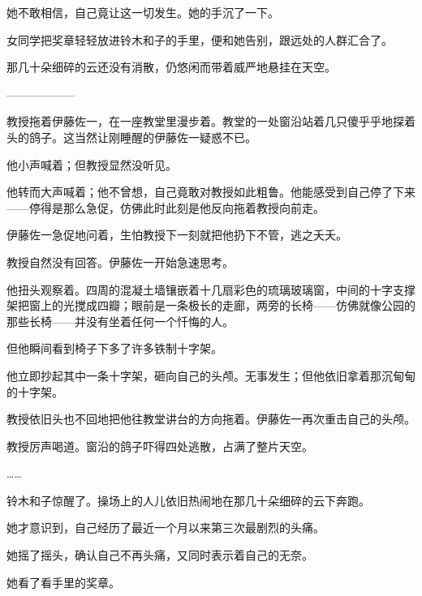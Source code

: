 她不敢相信，自己竟让这一切发生。她的手沉了一下。

女同学把奖章轻轻放进铃木和子的手里，便和她告别，跟远处的人群汇合了。

那几十朵细碎的云还没有消散，仍悠闲而带着威严地悬挂在天空。

\begin{center}
——————
\end{center}

教授拖着伊藤佐一，在一座教堂里漫步着。教堂的一处窗沿站着几只傻乎乎地探着头的鸽子。这当然让刚睡醒的伊藤佐一疑惑不已。

他小声喊着；但教授显然没听见。

他转而大声喊着；他不曾想，自己竟敢对教授如此粗鲁。他能感受到自己停了下来——停得是那么急促，仿佛此时此刻是他反向拖着教授向前走。

伊藤佐一急促地问着，生怕教授下一刻就把他扔下不管，逃之夭夭。

教授自然没有回答。伊藤佐一开始急速思考。


他扭头观察着。四周的混凝土墙镶嵌着十几扇彩色的琉璃玻璃窗，中间的十字支撑架把窗上的光搅成四瓣；眼前是一条极长的走廊，两旁的长椅——仿佛就像公园的那些长椅——并没有坐着任何一个忏悔的人。

但他瞬间看到椅子下多了许多铁制十字架。


他立即抄起其中一条十字架，砸向自己的头颅。无事发生；但他依旧拿着那沉甸甸的十字架。

教授依旧头也不回地把他往教堂讲台的方向拖着。伊藤佐一再次重击自己的头颅。

教授厉声喝道。窗沿的鸽子吓得四处逃散，占满了整片天空。

……

铃木和子惊醒了。操场上的人儿依旧热闹地在那几十朵细碎的云下奔跑。

她才意识到，自己经历了最近一个月以来第三次最剧烈的头痛。

她摇了摇头，确认自己不再头痛，又同时表示着自己的无奈。

她看了看手里的奖章。





















